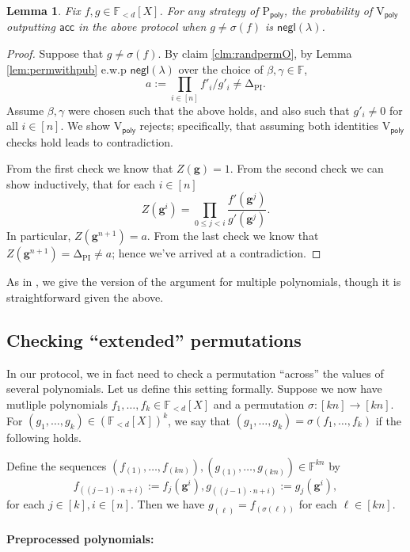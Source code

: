 \documentclass[11pt]{article} %
\newcommand{\F}{\ensuremath{\mathbb F}\xspace}
\newcommand{\sigof}[1]{\ensuremath{\sigma(#1)}\xspace}
\newcommand{\pubinputdelta}{\ensuremath{\mathrm{\Delta_{\mathrm{PI}}}}\xspace}
\newcommand{\negl}{\ensuremath{\mathsf{negl}(\lambda)}\xspace}
\newcommand{\acc}{\ensuremath{\mathsf{acc}}\xspace}
\newcommand{\defeq}{:=}
\newcommand{\prvpoly}{\ensuremath{\mathrm{P_{\mathsf{poly}}}}\xspace}
\newcommand{\verpoly}{\ensuremath{\mathrm{V_{\mathsf{poly}}}}\xspace}
\newcommand{\hgen}{\ensuremath{\mathbf{g}}\xspace}
\newcommand{\polysofdeg}[1]{\ensuremath{\F_{< #1}[X]}\xspace}
\newtheorem{lemma}{Lemma}[section]
\begin{document}
\begin{lemma}\label{lem:permprotocol}
Fix $f,g \in \polysofdeg{d}$.
For any strategy of \prvpoly, the probability of \verpoly outputting \acc in the above protocol when $g\neq \sigof{f}$ is \negl.
\end{lemma}
\begin{proof}
 Suppose that $g\neq \sigof{f}$. By claim \ref{clm:randpermO}, by Lemma \ref{lem:permwithpub} e.w.p \negl over the choice of $\beta,\gamma\in \F$, 
 \[a\defeq \prod_{i\in [n]}f'_i/g'_i \neq \pubinputdelta.\]
 Assume $\beta,\gamma$ were chosen such that the above holds, and also such that $g'_i\neq 0$ for all $i\in [n]$. We show \verpoly rejects; specifically, that assuming both identities \verpoly checks hold leads to contradiction.
 
 From the first check we know that $Z(\hgen) = 1$.
From the second check we can show inductively, that for each $i\in [n]$
\[Z(\hgen^{i}) = \prod_{0\leq j < i} \frac{f'(\hgen^j)}{g'(\hgen^j)}.\]
In particular, $Z(\hgen^{n+1})=a$.
From the last check we know that $Z(\hgen^{n+1})=\pubinputdelta\neq a$;
hence we've arrived at a contradiction.
\end{proof}



As in \cite{plonk}, we give the version of the argument for multiple polynomials, though it is straightforward given the above.
\subsection{Checking ``extended''  permutations}\label{subsec:extperm}
In our protocol, we in fact need to check a permutation ``across'' the values of several polynomials.
Let us define this setting formally.
Suppose we now have mutliple polynomials $f_1,\ldots,f_k\in \polysofdeg{d}$ and a permutation $\sigma:[kn]\to [kn]$.
For $(g_1,\ldots,g_k)\in \left(\polysofdeg{d}\right)^k$, we say that
$(g_1,\ldots,g_k)=\sigof{f_1,\ldots,f_k}$ if the following holds.

Define the sequences $(f_{(1)},\ldots, f_{(kn)}),(g_{(1)},\ldots,g_{(kn)}) \in \F^{kn}$
by 
\[f_{((j-1)\cdot n + i)} \defeq f_j(\hgen^{i}), g_{((j-1)\cdot n + i)} \defeq g_j(\hgen^{i}),\]
for each $j\in [k], i\in [n]$.
Then we have $g_{(\ell)} = f_{(\sigma(\ell))}$ for each $\ell \in [kn]$.



\paragraph{Preprocessed polynomials:}
\end{document}
